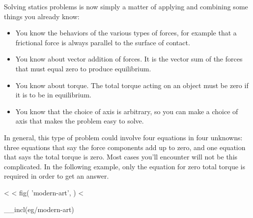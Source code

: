 Solving statics problems is now simply a matter of applying
and combining some things you already know:

\begin{itemize}

\item You know the behaviors of the various types of forces, for
example that a frictional force is always parallel to
the surface of contact.

\item You know about vector addition of forces. It is the vector
sum of the forces that must equal zero to produce equilibrium.

\item You know about torque. The total torque acting on an
object must be zero if it is to be in equilibrium.

\item You know that the choice of axis is arbitrary, so you can
make a choice of axis that makes the problem easy to solve.

\end{itemize}

\noindent In general, this type of problem could involve four
equations in four unknowns: three equations that say the
force components add up to zero, and one equation that says
the total torque is zero. Most cases you'll encounter will
not be this complicated. In the following example, only the
equation for zero total torque is required in order to get an answer.

\vfill\pagebreak[4]

<%
<%
  fig(
    'modern-art',
  )
<%

__incl(eg/modern-art)

